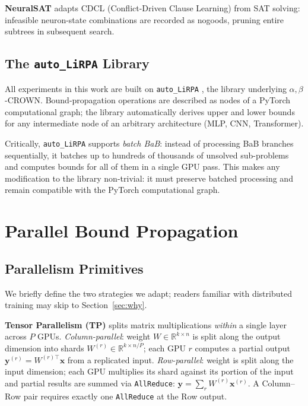 \documentclass[11pt]{article}
\begin{document}
\textbf{NeuralSAT} \citep{NeuralSATRepo} adapts CDCL (Conflict-Driven Clause
Learning) from SAT solving: infeasible neuron-state combinations are recorded as
nogoods, pruning entire subtrees in subsequent search.

\subsection{The \texttt{auto\_LiRPA} Library}

All experiments in this work are built on \texttt{auto\_LiRPA}
\citep{AutoLiRPARepo}, the library underlying $\alpha,\beta$-CROWN.
Bound-propagation operations are described as nodes of a PyTorch computational
graph; the library automatically derives upper and lower bounds for any
intermediate node of an arbitrary architecture (MLP, CNN, Transformer).

Critically, \texttt{auto\_LiRPA} supports \emph{batch BaB}: instead of
processing BaB branches sequentially, it batches up to hundreds of thousands
of unsolved sub-problems and computes bounds for all of them in a single GPU
pass. This makes any modification to the library non-trivial: it must preserve
batched processing and remain compatible with the PyTorch computational graph.

\section{Parallel Bound Propagation}
\label{sec:method}

\subsection{Parallelism Primitives}
\label{sec:primitives}

We briefly define the two strategies we adapt; readers familiar with
distributed training may skip to Section~\ref{sec:why}.

\textbf{Tensor Parallelism (TP)} \citep{MegatronLM2020} splits matrix
multiplications \emph{within} a single layer across $P$ GPUs.
\emph{Column-parallel}: weight $W \in \mathbb{R}^{k \times n}$ is split
along the output dimension into shards
$W^{(r)} \in \mathbb{R}^{k \times n/P}$; each GPU $r$ computes a partial
output $\mathbf{y}^{(r)} = W^{(r)\top}\mathbf{x}$ from a replicated input.
\emph{Row-parallel}: weight is split along the input dimension; each GPU
multiplies its shard against its portion of the input and partial results are
summed via \texttt{AllReduce}: $\mathbf{y} = \sum_r W^{(r)}\mathbf{x}^{(r)}$.
A Column--Row pair requires exactly one \texttt{AllReduce} at the Row output.
\end{document}
